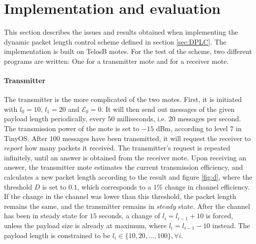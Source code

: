 \section{Implementation and evaluation}
This section describes the issues and results obtained when implementing the dynamic packet length control scheme defined in section \ref{sec:DPLC}. The implementation is built on TelosB motes. For the test of the scheme, two different programs are written: One for a transmitter mote and for a receiver mote. 
\paragraph{Transmitter} The transmitter is the more complicated of the two motes. First, it is initiated with $l_0 = 10$, $l_1 = 20$ and $\mathcal{E}_0 = 0$. It will then send out messages of the given payload length periodically, every $50$ milliseconds, i.e. $20$ messages per second. The transmission power of the mote is set to $-15$ dBm, according to level $7$ in TinyOS. After $100$ messages have been transmitted, it will request the receiver to $report$ how many packets it received. The transmitter's request is repeated infinitely, until an answer is obtained from the receiver mote. Upon receiving an answer, the transmitter mote estimates the current transmission efficiency, and calculates a new packet length according to the result and figure \ref{fig:d}, where the threshold $D$ is set to $0.1$, which corresponds to a $1 \%$ change in channel efficiency. If the change in the channel was lower than this threshold, the packet length remains the same, and the transmitter remains in $steady$ state. After the channel has been in steady state for $15$ seconds, a change of $l_i = l_{i-1} +10$ is forced, unless the payload size is already at maximum, where $l_i = l_{i-1} - 10$ instead. The payload length is constrained to be $l_i \in \{10, 20, ... , 100\},\forall i$.
